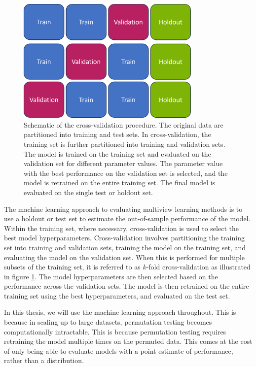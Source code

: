 \begin{figure}
    \centering
    \includegraphics[width=0.8\textwidth]{figures/cross-validation.png}
    \caption{Schematic of the cross-validation procedure. The original data are partitioned into training and test sets. In cross-validation, the training set is further partitioned into training and validation sets. The model is trained on the training set and evaluated on the validation set for different parameter values. The parameter value with the best performance on the validation set is selected, and the model is retrained on the entire training set. The final model is evaluated on the single test or holdout set.}
    \label{fig:machine-learning}
\end{figure}

The machine learning approach to evaluating multiview learning methods is to use a holdout or test set to estimate the out-of-sample performance of the model.
Within the training set, where necessary, cross-validation is used to select the best model hyperparameters.
Cross-validation involves partitioning the training set into training and validation sets, training the model on the training set, and evaluating the model on the validation set.
When this is performed for multiple subsets of the training set, it is referred to as \(k\)-fold cross-validation as illustrated in figure \ref{fig:machine-learning}.
The model hyperparameters are then selected based on the performance across the validation sets.
The model is then retrained on the entire training set using the best hyperparameters, and evaluated on the test set.

In this thesis, we will use the machine learning approach throughout.
This is because in scaling up to large datasets, permutation testing becomes computationally intractable.
This is because permutation testing requires retraining the model multiple times on the permuted data.
This comes at the cost of only being able to evaluate models with a point estimate of performance, rather than a distribution.

